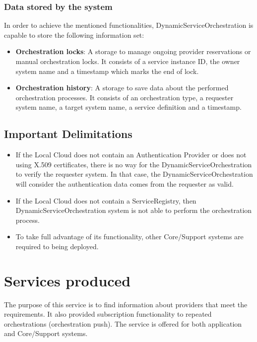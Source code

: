 \documentclass[a4paper]{arrowhead}
\begin{document}
\subsubsection {Data stored by the system}
In order to achieve the mentioned functionalities, DynamicServiceOrchestration is capable to store the following information set:

\begin{itemize}
    \item \textbf{Orchestration locks}: A storage to manage ongoing provider reservations or manual orchestration locks. It consists of a service instance ID, the owner system name and a timestamp which marks the end of lock.
    \item \textbf{Orchestration history}: A storage to save data about the performed orchestration processes. It consists of an orchestration type, a requester system name, a target system name, a service definition and a timestamp.
\end{itemize}

\subsection{Important Delimitations}
\label{sec:delimitations}

\begin{itemize}
    \item If the Local Cloud does not contain an Authentication Provider or does not using X.509 certificates, there is no way for the DynamicServiceOrchestration to verify the requester system. In that case, the DynamicServiceOrchestration will consider the authentication data comes from the requester as valid.
    \item If the Local Cloud does not contain a ServiceRegistry, then DynamicServiceOrchestration system is not able to perform the orchestration process.
    \item To take full advantage of its functionality, other Core/Support systems are required to being deployed.
\end{itemize} 

\newpage

\section{Services produced}
\label{sec:services}

The purpose of this service is to find information about providers that meet the requirements. It also provided subscription functionality to repeated orchestrations (orchestration push). The service is offered for both application and Core/Support systems. 
\end{document}
